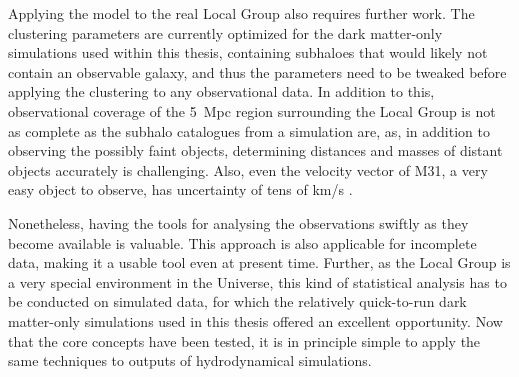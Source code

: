 \documentclass[english, twoside]{HYgradu}
\begin{document}
Applying the model to the real Local Group also requires further work. The clustering parameters are currently optimized for the dark matter-only simulations used within this thesis, containing subhaloes that would likely not contain an observable galaxy, and thus the parameters need to be tweaked before applying the clustering to any observational data. In addition to this, observational coverage of the 5~Mpc region surrounding the Local Group is not as complete as the subhalo catalogues from a simulation are, as, in addition to observing the possibly faint objects, determining distances and masses of distant objects accurately is challenging. Also, even the velocity vector of M31, a very easy object to observe, has uncertainty of tens of km/s \citep{vandermarel2012m31, vandermarel2018first}.

Nonetheless, having the tools for analysing the observations swiftly as they become available is valuable. This approach is also applicable for incomplete data, making it a usable tool even at present time. Further, as the Local Group is a very special environment in the Universe, this kind of statistical analysis has to be conducted on simulated data, for which the relatively quick-to-run dark matter-only simulations used in this thesis offered an excellent opportunity. Now that the core concepts have been tested, it is in principle simple to apply the same techniques to outputs of hydrodynamical simulations.


\clearpage
{} %



\newpage
\appendix
\end{document}
